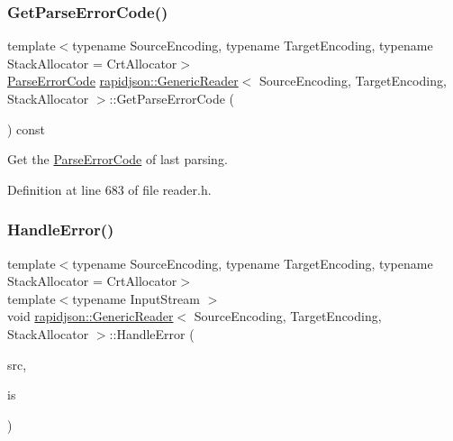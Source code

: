\subsubsection{\texorpdfstring{GetParseErrorCode()}{GetParseErrorCode()}}
{\footnotesize\ttfamily template$<$typename Source\+Encoding, typename Target\+Encoding, typename Stack\+Allocator = Crt\+Allocator$>$ \\
\mbox{\hyperlink{group___r_a_p_i_d_j_s_o_n___e_r_r_o_r_s_ga7d3acf640886b1f2552dc8c4cd6dea60}{Parse\+Error\+Code}} \mbox{\hyperlink{classrapidjson_1_1_generic_reader}{rapidjson\+::\+Generic\+Reader}}$<$ Source\+Encoding, Target\+Encoding, Stack\+Allocator $>$\+::Get\+Parse\+Error\+Code (\begin{DoxyParamCaption}{ }\end{DoxyParamCaption}) const}



Get the \mbox{\hyperlink{group___r_a_p_i_d_j_s_o_n___e_r_r_o_r_s_ga7d3acf640886b1f2552dc8c4cd6dea60}{Parse\+Error\+Code}} of last parsing. 



Definition at line 683 of file reader.\+h.


\begin{DoxyCode}{0}

\end{DoxyCode}
\mbox{\label{classrapidjson_1_1_generic_reader_a5be3daf2d1424c4cfb6bc6016f1631fa}} 
\subsubsection{\texorpdfstring{HandleError()}{HandleError()}}
{\footnotesize\ttfamily template$<$typename Source\+Encoding, typename Target\+Encoding, typename Stack\+Allocator = Crt\+Allocator$>$ \\
template$<$typename Input\+Stream $>$ \\
void \mbox{\hyperlink{classrapidjson_1_1_generic_reader}{rapidjson\+::\+Generic\+Reader}}$<$ Source\+Encoding, Target\+Encoding, Stack\+Allocator $>$\+::Handle\+Error (\begin{DoxyParamCaption}\item[{\mbox{\hyperlink{classrapidjson_1_1_generic_reader_a1fd8fb2f2f017d42c89a5e11cd074e1e}{Iterative\+Parsing\+State}}}]{src,  }\item[{Input\+Stream \&}]{is }\end{DoxyParamCaption})\hspace{0.3cm}{\ttfamily [private]}}



